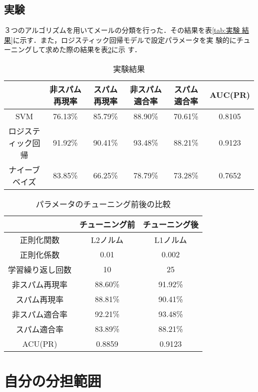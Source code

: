 \documentclass[a4paper,12pt]{jarticle}
\begin{document}
\subsection{実験}
３つのアルゴリズムを用いてメールの分類を行った．その結果を表\ref{tab:実験
結果}に示す．また，ロジスティック回帰モデルで設定パラメータを実
験的にチューニングして求めた際の結果を表\ref{tab:パラメータのチューニング前後の比較}に示
す．

\begin{table}[bt]
\centering
\caption{実験結果}
\label{tab:実験結果}
\fontsize{9pt}{10pt}\selectfont
\begin{tabular}{|c|c|c|c|c|c|} \hline
 &非スパム再現率&スパム再現率&非スパム適合率&スパム適合率&AUC(PR) \\ \hline
SVM& 76.13\%& 85.79\%& 88.90\%& 70.61\% & 0.8105 \\ \hline
ロジスティック回帰&91.92\% & 90.41\% & 93.48\% & 88.21\% & 0.9123 \\ \hline
ナイーブベイズ& 83.85\% & 66.25\% & 78.79\%  & 73.28\% & 0.7652  \\ \hline
\end{tabular}
\end{table}

\begin{table}[bt]
\centering
\caption{パラメータのチューニング前後の比較}
\label{tab:パラメータのチューニング前後の比較}
\fontsize{9pt}{10pt}\selectfont
\begin{tabular}{|c|c|c|} \hline
 &チューニング前&チューニング後 \\ \hline
正則化関数& L2ノルム & L1ノルム \\ \hline
正則化係数&0.01 & 0.002 \\ \hline
学習繰り返し回数  &10 & 25  \\ \hline \hline
非スパム再現率& 88.60\%& 91.92\% \\ \hline
スパム再現率& 88.81\%& 90.41\% \\ \hline
非スパム適合率& 92.21\%& 93.48\% \\ \hline
スパム適合率& 83.89\%& 88.21\% \\ \hline
ACU(PR)& 0.8859 &0.9123 \\ \hline
\end{tabular}
\end{table}

\section{自分の分担範囲}
\end{document}
